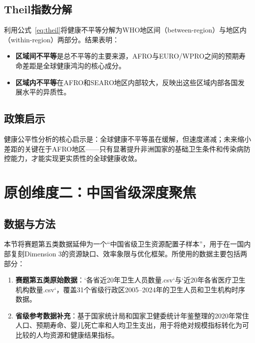 \documentclass[12pt,a4paper]{ctexart}
\begin{document}
\subsection{Theil指数分解}

利用公式~\eqref{eq:theil}将健康不平等分解为WHO地区间（between-region）与地区内（within-region）两部分。结果表明：

\begin{itemize}[leftmargin=1.5em]
    \item \textbf{区域间不平等}是总不平等的主要来源，AFRO与EURO/WPRO之间的预期寿命差距是全球健康鸿沟的核心成分。
    \item \textbf{区域内不平等}在AFRO和SEARO地区内部较大，反映出这些区域内部各国发展水平的异质性。
\end{itemize}

\subsection{政策启示}

健康公平性分析的核心启示是：全球健康不平等虽在缓解，但速度递减；未来缩小差距的关键在于AFRO地区——只有显著提升非洲国家的基础卫生条件和传染病防控能力，才能实现更实质性的全球健康收敛。

\section{原创维度二：中国省级深度聚焦}

\subsection{数据与方法}

本节将赛题第五类数据延伸为一个“中国省级卫生资源配置子样本”，用于在一国内部复刻Dimension 3的资源缺口、效率象限与优化框架。所使用的数据主要包括两部分：

\begin{enumerate}[label=\arabic*)]
    \item \textbf{赛题第五类原始数据}：`各省近20年卫生人员数量.csv`与`近20年各省医疗卫生机构数量.csv`，覆盖31个省级行政区2005--2024年的卫生人员和卫生机构时序数据。
    \item \textbf{省级参考数据补充}：基于国家统计局和国家卫健委统计年鉴整理的2020年常住人口、预期寿命、婴儿死亡率和人均卫生支出，用于将绝对规模指标转化为可比较的人均资源和健康结果指标。
\end{enumerate}
\end{document}
